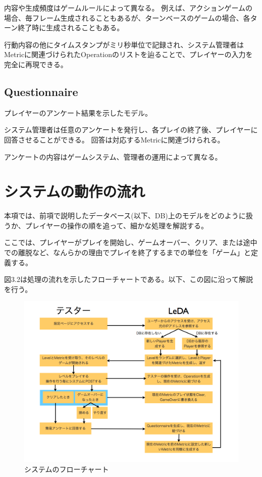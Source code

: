 内容や生成頻度はゲームルールによって異なる。
例えば、アクションゲームの場合、毎フレーム生成されることもあるが、ターンベースのゲームの場合、各ターン終了時に生成されることもある。

行動内容の他にタイムスタンプがミリ秒単位で記録され、システム管理者はMetricに関連づけられたOperationのリストを辿ることで、プレイヤーの入力を完全に再現できる。

\subsection{Questionnaire}
プレイヤーのアンケート結果を示したモデル。

システム管理者は任意のアンケートを発行し、各プレイの終了後、プレイヤーに回答させることができる。
回答は対応するMetricに関連づけられる。

アンケートの内容はゲームシステム、管理者の運用によって異なる。

\section{システムの動作の流れ}
本項では、前項で説明したデータベース(以下、DB)上のモデルをどのように扱うか、プレイヤーの操作の順を追って、細かな処理を解説する。

ここでは、プレイヤーがプレイを開始し、ゲームオーバー、クリア、または途中での離脱など、なんらかの理由でプレイを終了するまでの単位を「ゲーム」と定義する。

図3.2は処理の流れを示したフローチャートである。以下、この図に沿って解説を行う。

\begin{figure}[htbp]
  \begin{center}
    \includegraphics[bb=0 0 1024 768, width=15cm]{images/flow.png}
  \end{center}
  \caption{システムのフローチャート}
  \label{fig:one}
\end{figure}

